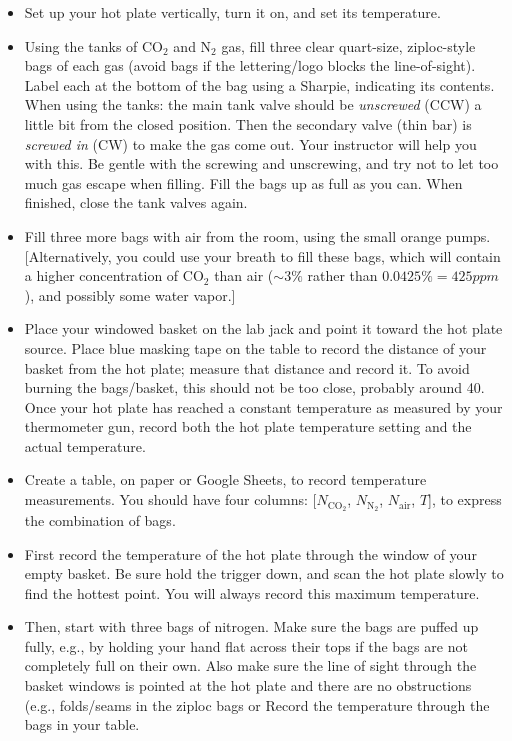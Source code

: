 	\begin{itemize}
	\item Set up your hot plate vertically,  turn it on, and set its temperature.
	\item Using the tanks of $\text{CO}_2$ and $\text{N}_2$ gas, fill three clear quart-size, ziploc-style bags of each gas (avoid bags if the lettering/logo blocks the line-of-sight). Label each at the bottom of the bag using a Sharpie, indicating its contents.  When using the tanks: the main tank valve should be {\em unscrewed} (CCW) a little bit from the closed position.  Then the secondary valve (thin bar) is {\em screwed in} (CW) to make the gas come out. Your instructor will help you with this. Be gentle with the screwing and unscrewing, and try not to let too much gas escape when filling. Fill the bags up as full as you can. When finished, close the tank valves again.
	\item Fill three more bags with air from the room, using the small orange pumps. [Alternatively, you could use your breath to fill these bags, which will contain a higher concentration of $\text{CO}_2$ than air ($\sim 3\%$ rather than $0.0425\%=\unit{425}{ppm}$), and possibly some water vapor.]
	\item Place your windowed basket on the lab jack and point it toward the hot plate source.  Place blue masking tape on the table to record the distance of your basket from the hot plate; measure that distance and record it.  To avoid burning the bags/basket, this should not be too close, probably around \unit{40}{\centi\meter}.  Once your hot plate has reached a constant temperature as measured by your thermometer gun, record both the hot plate temperature setting and the actual temperature.
	\item Create a table, on paper or Google Sheets, to record temperature measurements.  You should have four columns: [$N_{\text{CO}_2}$, $N_{\text{N}_2}$, $N_\text{air}$, $T$], to express the combination of bags.
	\item First record the temperature of the hot plate through the window of your empty basket. Be sure hold the trigger down, and scan the hot plate slowly to find the hottest point.  You will always record this maximum temperature.
	\item Then, start with three bags of nitrogen.  Make sure the bags are puffed up fully, e.g., by holding your hand flat across their tops if the bags are not completely full on their own. Also make sure the line of sight through the basket windows is pointed at the hot plate and there are no obstructions (e.g., folds/seams in the ziploc bags or  Record the temperature through the bags in your table.

\end{itemize}
